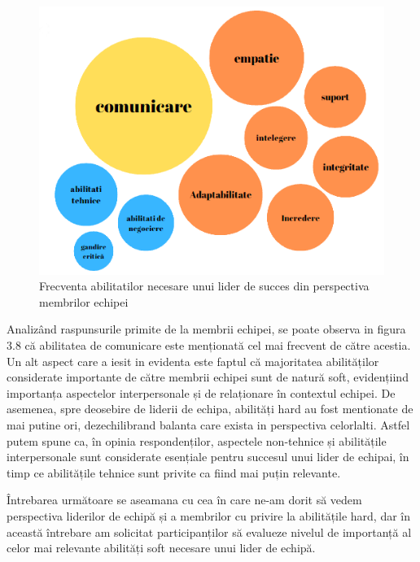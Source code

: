 \documentclass[a4paper, 12pt]{article}
\begin{document}
\begin{figure}[!htb]
			\centering
			\includegraphics[width=14cm, height=10 cm]{"figures/team members succes.png"}
			\caption {Frecventa abilitatilor necesare unui lider de succes din perspectiva membrilor echipei}\label{fig:four}
	
		\end{figure}

	\quad Analizând raspunsurile primite de la membrii echipei, se poate observa in figura 3.8 că abilitatea de comunicare este menționată cel mai frecvent de către acestia. Un alt  aspect care a iesit in evidenta este faptul că majoritatea abilităților considerate importante de către membrii echipei sunt de natură soft, evidențiind importanța aspectelor interpersonale și de relaționare în contextul echipei. De asemenea, spre deosebire de liderii de echipa, abilități hard au fost mentionate de mai putine ori, dezechilibrand balanta care exista in perspectiva celorlalti. Astfel putem spune ca, în opinia respondenților, aspectele non-tehnice și abilitățile interpersonale sunt considerate esențiale pentru succesul unui lider de echipai, în timp ce abilitățile tehnice sunt privite ca fiind mai puțin relevante.

	\quad Întrebarea următoare se aseamana cu cea în care ne-am dorit să vedem perspectiva liderilor de echipă și a membrilor cu privire la abilitățile hard, dar în această întrebare am solicitat participanților să evalueze nivelul de importanță al celor mai relevante abilități soft necesare unui lider de echipă.
\end{document}
